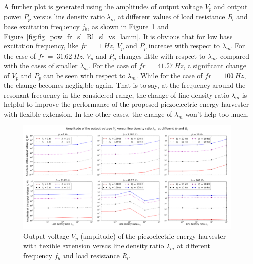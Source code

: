 \documentclass{elsarticle}
\begin{document}
A further plot is generated using the amplitudes of output voltage $V_p$ and output power $P_p$ versus line density ratio $\lambda_m$ at different values of load resistance $R_l$ and base excitation frequency $f_b$, as shown in Figure~\ref{fig:fig_vol_fr_sl_Rl_sl_vs_lamm} and Figure~\ref{fig:fig_pow_fr_sl_Rl_sl_vs_lamm}. It is obvious that for low base excitation frequency, like $fr\ =\ 1\ Hz$, $V_p$ and $P_p$ increase with respect to $\lambda_m$. For the case of $fr\ =\ 31.62 \ Hz$, $V_p$ and $P_p$ changes little with respect to $\lambda_m$, compared with the cases of smaller $\lambda_m$. For the case of $fr\ =\ 41.27 \ Hz$, a significant change of $V_p$ and $P_p$ can be seen with respect to $\lambda_m$. While for the case of $fr\ =\ 100 \ Hz$, the change becomes negligible again. That is to say, at the frequency around the resonant frequency in the considered range, the change of line density ratio $\lambda_m$ is helpful to improve the performance of the proposed piezoelectric energy harvester with flexible extension. In the other cases, the change of $\lambda_m$ won't help too much. 



\begin{figure}[!htbp]
    \centering
    \includegraphics[width=\textwidth]{./fig_vol_fr_sl_Rl_sl_vs_lamm}
    \caption{Output voltage $V_p$ (amplitude) of the piezoelectric energy harvester with flexible extension versus line density ratio $\lambda_m$ at different frequency $f_b$ and load resistance $R_l$. \color{red}{legend to be revised} }
    \label{fig:fig_vol_fr_sl_Rl_sl_vs_lamm}
\end{figure}
\end{document}
